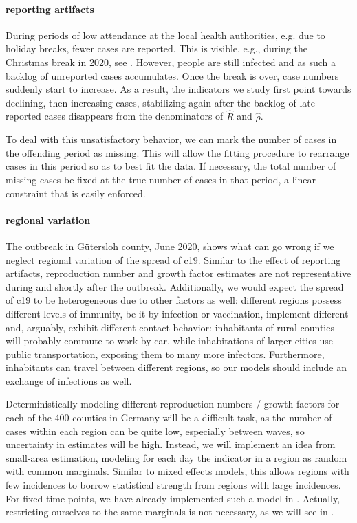 \paragraph{reporting artifacts}
During periods of low attendance at the local health authorities, e.g. due to holiday breaks, fewer cases are reported. This is visible, e.g., during the Christmas break in 2020, see . However, people are still infected and as such a backlog of unreported cases accumulates. Once the break is over, case numbers suddenly start to increase. As a result, the indicators we study first point towards declining, then increasing cases, stabilizing again after the backlog of late reported cases disappears from the denominators of $\hat R$ and $\hat \rho$. 

To deal with this unsatisfactory behavior, we can mark the number of cases in the offending period as missing. This will allow the fitting procedure to rearrange cases in this period so as to best fit the data. If necessary, the total number of missing cases be fixed at the true number of cases in that period, a linear constraint that is easily enforced.
\bigskip


\paragraph{regional variation}
The outbreak in Gütersloh county, June 2020, shows what can go wrong if we neglect regional variation of the spread of \acrshort{c19}. Similar to the effect of reporting artifacts, reproduction number and growth factor estimates are  not representative during and shortly after the outbreak. Additionally, we would expect the spread of \acrshort{c19} to be heterogeneous due to other factors as well: different regions possess different levels of immunity, be it by infection or vaccination, implement different  and, arguably, exhibit different contact behavior: inhabitants of rural counties will probably commute to work by car, while inhabitations of larger cities use public transportation, exposing them to many more infectors. Furthermore, inhabitants can travel between different regions, so our models should include an exchange of infections as well. 

Deterministically modeling different reproduction numbers / growth factors for each of the 400 counties in Germany will be a difficult task, as the number of cases within each region can be quite low, especially between waves, so uncertainty in estimates will be high. Instead, we will implement an idea from small-area estimation, modeling for each day the indicator in a region as random with common marginals. Similar to mixed effects models, this allows regions with few incidences to \glqq{}borrow statistical strength\grqq{} from regions with large incidences. For fixed time-points, we have already implemented such a model in \citep{Burgard2021Regional}. Actually, restricting ourselves to the same marginals is not necessary, as we will see in . 

